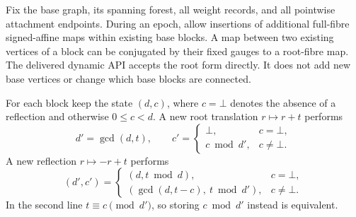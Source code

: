 \documentclass[11pt]{article}
\theoremstyle{definition}
\begin{document}
Fix the base graph, its spanning forest, all weight records, and all pointwise attachment endpoints. During an epoch, allow insertions of additional full-fibre signed-affine maps within existing base blocks. A map between two existing vertices of a block can be conjugated by their fixed gauges to a root-fibre map. The delivered dynamic API accepts the root form directly. It does not add new base vertices or change which base blocks are connected.

For each block keep the state $(d,c)$, where $c=\bot$ denotes the absence of a reflection and otherwise $0\le c<d$. A new root translation $r\mapsto r+t$ performs
\[
 d' = \gcd(d,t),\qquad
 c'=\begin{cases}\bot,&c=\bot,\\c\bmod d',&c\ne\bot.\end{cases}
\]
A new reflection $r\mapsto-r+t$ performs
\[
 (d',c')=\begin{cases}
 (d,t\bmod d),&c=\bot,\\
 (\gcd(d,t-c),\ t\bmod d'),&c\ne\bot.
 \end{cases}
\]
In the second line $t\equiv c\pmod{d'}$, so storing $c\bmod d'$ instead is equivalent.
\end{document}
